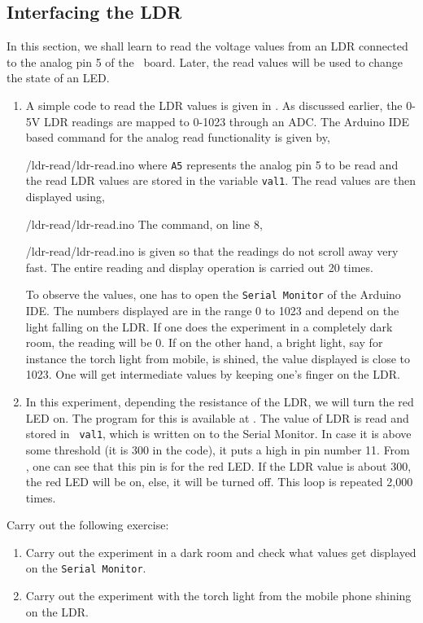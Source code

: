 \subsection{Interfacing the LDR}
In this section, we shall learn to read the voltage values from an LDR
connected to the analog pin 5 of the \arduino\ board. Later, the read
values will be used to change the state of an LED.   
\begin{enumerate}
\item A simple code to read the LDR values is given in
  . As discussed earlier, the 0-5V LDR readings
  are mapped to 0-1023 through an ADC. The 
  Arduino IDE
  based command for the analog read functionality is given by,
  
  {\LocLDRardcode/ldr-read/ldr-read.ino} where {\tt A5} represents the
  analog pin 5 to be read and the read LDR values are stored in the
  variable {\tt val1}.  The read values are then displayed using,
  
  {\LocLDRardcode/ldr-read/ldr-read.ino} The command, on line 8,
  
  {\LocLDRardcode/ldr-read/ldr-read.ino} is given so that the readings
  do not scroll away very fast.  The entire reading and display
  operation is carried out 20 times.

  To observe the values, one has to open the {\tt Serial Monitor} of
  the Arduino IDE.  The numbers displayed are in the range 0 to 1023
  and depend on the light falling on the LDR.  If one does the
  experiment in a completely dark room, the reading will be 0.  If on
  the other hand, a bright light, say for instance the torch light
  from mobile, is shined, the value displayed is close to 1023.  One
  will get intermediate values by keeping one's finger on the LDR.

\item In this experiment, depending the resistance of the LDR, we will
  turn the red LED on.  The program for this is available at
  .  The value of LDR is read and stored in {\tt
    val1}, which is written on to the Serial Monitor.  In case it is
  above some threshold (it is 300 in the code), it puts a high in pin
  number 11.  From , one can see that this pin is
  for the red LED.  If the LDR value is about 300, the red LED will be
  on, else, it will be turned off.  This loop is repeated 2,000 times.
\end{enumerate}

\begin{exercise}
Carry out the following exercise:
\begin{enumerate}
\item Carry out the experiment in a dark room and check what values
  get displayed on the {\tt Serial Monitor}.
\item Carry out the experiment with the torch light from the mobile
  phone shining on the LDR.
\end{enumerate}
\end{exercise}

